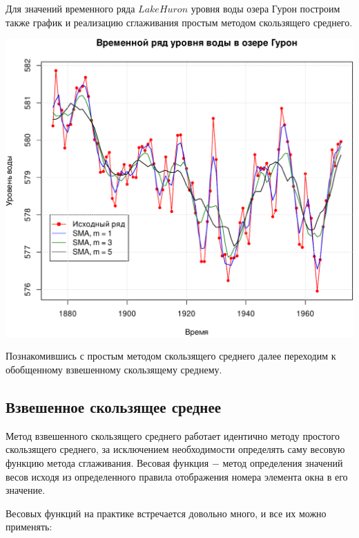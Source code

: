 \documentclass[
]{article}
\begin{document}
Для значений временного ряда \(LakeHuron\) уровня воды озера Гурон
построим также график и реализацию сглаживания простым методом
скользящего среднего.

\begin{center}\includegraphics[width=0.6\linewidth]{Prac6_files/figure-latex/unnamed-chunk-6-1} \end{center}

Познакомившись с простым методом скользящего среднего далее переходим к
обобщенному взвешенному скользящему среднему.

\hypertarget{ux432ux437ux432ux435ux448ux435ux43dux43dux43eux435-ux441ux43aux43eux43bux44cux437ux44fux449ux435ux435-ux441ux440ux435ux434ux43dux435ux435}{%
\subsection{\texorpdfstring{\textbf{Взвешенное скользящее
среднее}}{Взвешенное скользящее среднее}}\label{ux432ux437ux432ux435ux448ux435ux43dux43dux43eux435-ux441ux43aux43eux43bux44cux437ux44fux449ux435ux435-ux441ux440ux435ux434ux43dux435ux435}}

Метод взвешенного скользящего среднего работает идентично методу
простого скользящего среднего, за исключением необходимости определять
саму весовую функцию метода сглаживания. Весовая функция \(-\) метод
определения значений весов исходя из определенного правила отображения
номера элемента окна в его значение.

Весовых функций на практике встречается довольно много, и все их можно
применять:
\end{document}
